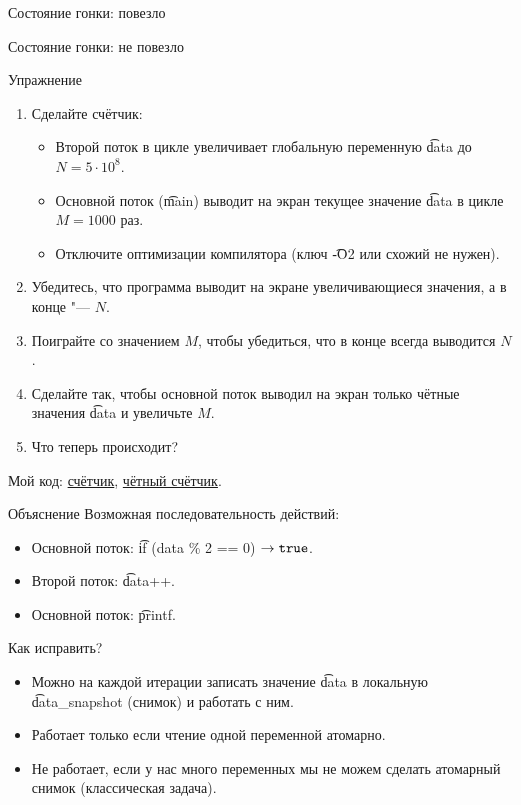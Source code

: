 \begin{frame}{Состояние гонки: повезло}
\end{frame}

\begin{frame}{Состояние гонки: не повезло}
\end{frame}

\begin{frame}{Упражнение}
	\begin{enumerate}
		\item Сделайте счётчик:
			\begin{itemize}
				\item Второй поток в цикле увеличивает глобальную переменную \t{data} до $N = 5 \cdot 10^8$.
				\item Основной поток (\t{main}) выводит на экран текущее значение \t{data} в цикле $M = 1000$ раз.
				\item Отключите оптимизации компилятора (ключ \t{-O2} или схожий не нужен).
			\end{itemize}
		\item Убедитесь, что программа выводит на экране увеличивающиеся значения, а в конце "--- $N$.
		\item Поиграйте со значением $M$, чтобы убедиться, что в конце всегда выводится $N$.
		\item Сделайте так, чтобы основной поток выводил на экран только чётные значения \t{data} и увеличьте $M$.
		\item Что теперь происходит?
	\end{enumerate}
	Мой код:
	\href{https://raw.githubusercontent.com/yeputons/spring-2019-paradigms/master/190410/sources/05-counter.cpp}{счётчик},
	\href{https://raw.githubusercontent.com/yeputons/spring-2019-paradigms/master/190410/sources/06-even-counter.cpp}{чётный счётчик}.
\end{frame}

\begin{frame}{Объяснение}
	Возможная последовательность действий:
	\begin{itemize}
		\item Основной поток: \t{if (data \% 2 == 0)} $\to \t{true}$.
		\item Второй поток: \t{data++}.
		\item Основной поток: \t{printf}.
	\end{itemize}
	Как исправить?
	\pause
	\begin{itemize}
		\item Можно на каждой итерации записать значение \t{data} в локальную \t{data\_snapshot} (снимок) и работать с ним.
		\item Работает только если чтение одной переменной атомарно.
		\item Не работает, если у нас много переменных мы не можем сделать атомарный снимок (классическая задача).
	\end{itemize}
\end{frame}

